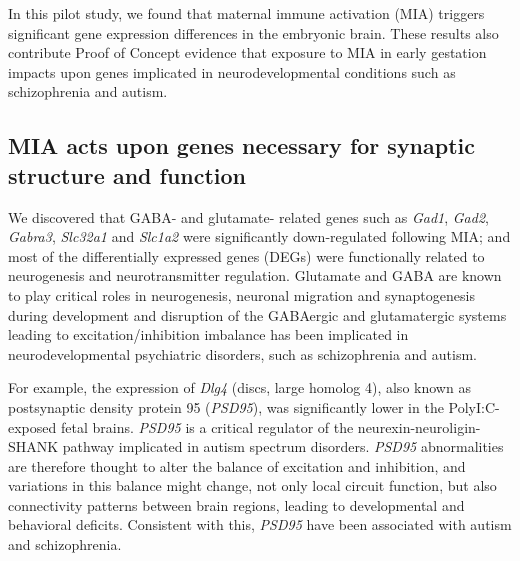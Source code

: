 In this pilot study, we found that maternal immune activation (MIA) triggers significant gene expression differences in the embryonic brain. 
These results also contribute Proof of Concept evidence that exposure to MIA in early gestation impacts upon genes implicated in neurodevelopmental conditions such as schizophrenia and autism. 

\subsection{MIA acts upon genes necessary for synaptic structure and function}
We discovered that GABA- and glutamate- related genes such as \textit{Gad1}, \textit{Gad2}, \textit{Gabra3}, \textit{Slc32a1} and \textit{Slc1a2} were significantly down-regulated following MIA; and most of the differentially expressed genes (DEGs) were functionally related to neurogenesis and neurotransmitter regulation.
Glutamate and GABA are known to play critical roles in neurogenesis, neuronal migration and synaptogenesis during development\cite{Cameron1998,LaMantia1995,LoTurco1995} and disruption of the GABAergic and glutamatergic systems leading to excitation/inhibition imbalance has been implicated in neurodevelopmental psychiatric disorders, such as schizophrenia\cite{Wassef2003} and autism\cite{Rubenstein2003}.

For example, the expression of \textit{Dlg4} (discs, large homolog 4), also known as postsynaptic density protein 95 (\textit{PSD95})\cite{DeBartolomeis2014}, was significantly lower in the PolyI:C-exposed fetal brains. 
\textit{PSD95} is a critical regulator of the neurexin-neuroligin-SHANK pathway implicated in autism spectrum disorders\cite{Feyder2010}.
\textit{PSD95} abnormalities are therefore thought to alter the balance of excitation and inhibition, and variations in this balance might change, not only local circuit function, but also connectivity patterns between brain regions, leading to developmental and behavioral deficits\cite{Cline2005}. 
Consistent with this, \textit{PSD95} have been associated with autism\cite{Risch1999} and schizophrenia\cite{Hahn2006}. 

